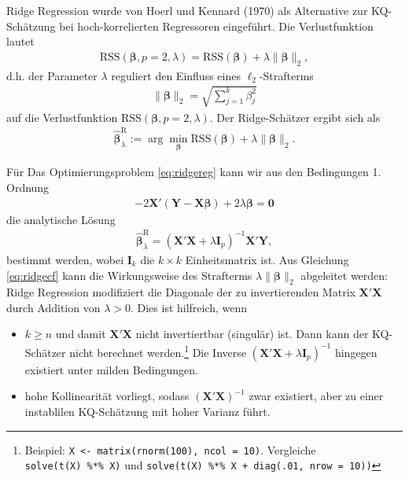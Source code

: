 \documentclass[
  a4paper,
  DIV=11,
  oneside]{scrreprt}
\begin{document}
Ridge Regression wurde von Hoerl und Kennard (1970) als Alternative zur
KQ-Schätzung bei hoch-korrelierten Regressoren eingeführt. Die
Verlustfunktion lautet \begin{align}
  \mathrm{RSS}(\boldsymbol{\beta},p=2,\lambda) = \mathrm{RSS}(\boldsymbol{\beta}) + \lambda \lVert\boldsymbol{\beta}\rVert_2,\label{eq:ridgeloss}
\end{align} d.h. der Parameter \(\lambda\) reguliert den Einfluss eines
\(\ell_2\)-Strafterms \begin{align*}
  \lVert\boldsymbol{\beta}\rVert_2 = \sqrt{\sum_{j=1}^k\beta_j^2}
\end{align*} auf die Verlustfunktion
\(\mathrm{RSS}(\boldsymbol{\beta},p=2,\lambda)\). Der Ridge-Schätzer
ergibt sich als \begin{align}
  \widehat{\boldsymbol{\beta}}^{\mathrm{R}}_\lambda := \arg\min_{\boldsymbol{\beta}}\mathrm{RSS}(\boldsymbol{\beta}) + \lambda \lVert\boldsymbol{\beta}\rVert_2.\label{eq:ridgereg}
\end{align}

Für Das Optimierungsproblem \eqref{eq:ridgereg} kann wir aus den
Bedingungen 1. Ordnung \begin{align}
  -2\boldsymbol{X}'(\boldsymbol{Y} - \boldsymbol{X}\boldsymbol{\beta}) + 2\lambda\boldsymbol{\beta} = \boldsymbol{0}
\end{align} die analytische Lösung \begin{align}
  \widehat{\boldsymbol{\beta}}^{\mathrm{R}}_\lambda = (\boldsymbol{X}'\boldsymbol{X} + \lambda\boldsymbol{I}_p)^{-1}\boldsymbol{X}'\boldsymbol{Y},\label{eq:ridgecf}
\end{align} bestimmt werden, wobei \(\boldsymbol{I}_k\) die
\(k\times k\) Einheitsmatrix ist. Aus Gleichung \eqref{eq:ridgecf} kann
die Wirkungsweise des Strafterms
\(\lambda \lVert\boldsymbol{\beta}\rVert_2\) abgeleitet werden: Ridge
Regression modifiziert die Diagonale der zu invertierenden Matrix
\(\boldsymbol{X}'\boldsymbol{X}\) durch Addition von \(\lambda>0\). Dies
ist hilfreich, wenn

\begin{itemize}
\item
  \(k\geq n\) und damit \(\boldsymbol{X}'\boldsymbol{X}\) nicht
  invertiertbar (singulär) ist. Dann kann der KQ-Schätzer nicht
  berechnet werden.\footnote{Beispiel:
    \texttt{X\ \textless{}-\ matrix(rnorm(100),\ ncol\ =\ 10)}.
    Vergleiche \texttt{solve(t(X)\ \%*\%\ X)} und
    \texttt{solve(t(X)\ \%*\%\ X\ +\ diag(.01,\ nrow\ =\ 10))}} Die
  Inverse
  \((\boldsymbol{X}'\boldsymbol{X} + \lambda\boldsymbol{I}_p)^{-1}\)
  hingegen existiert unter milden Bedingungen.
\item
  hohe Kollinearität vorliegt, sodass
  \((\boldsymbol{X}'\boldsymbol{X})^{-1}\) zwar existiert, aber zu einer
  instablilen KQ-Schätzung mit hoher Varianz führt.
\end{itemize}
\end{document}

